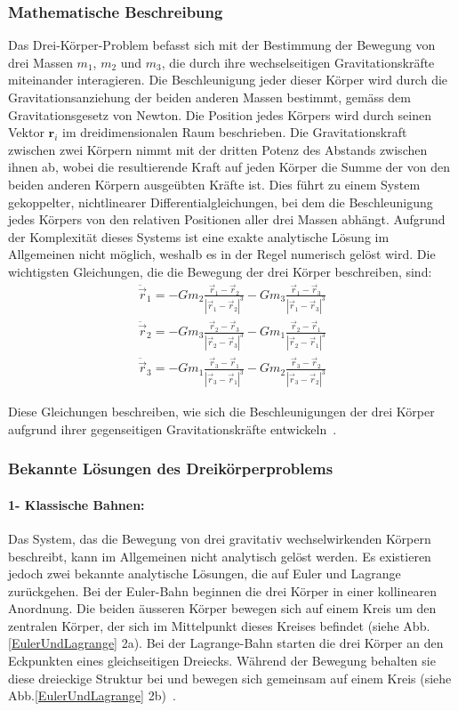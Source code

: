 \documentclass[a4paper,12pt,twoside]{article}
\begin{document}
\subsubsection{Mathematische Beschreibung}
Das Drei-Körper-Problem befasst sich mit der Bestimmung der Bewegung von drei Massen 
\( m_1 \), \( m_2 \) und \( m_3 \), die durch ihre wechselseitigen Gravitationskräfte 
miteinander interagieren. Die Beschleunigung jeder dieser Körper wird durch die 
Gravitationsanziehung der beiden anderen Massen bestimmt, gemäss dem Gravitationsgesetz 
von Newton. Die Position jedes Körpers wird durch seinen Vektor \( \mathbf{r}_i \) 
im dreidimensionalen Raum beschrieben. Die Gravitationskraft zwischen zwei Körpern 
nimmt mit der dritten Potenz des Abstands zwischen ihnen ab, wobei die resultierende 
Kraft auf jeden Körper die Summe der von den beiden anderen Körpern ausgeübten Kräfte ist. Dies führt zu einem System gekoppelter, nichtlinearer Differentialgleichungen, bei dem die Beschleunigung jedes Körpers von den relativen Positionen aller drei Massen abhängt. Aufgrund der Komplexität dieses Systems ist eine exakte analytische Lösung im Allgemeinen nicht möglich, weshalb es in der Regel numerisch gelöst wird.
Die wichtigsten Gleichungen, die die Bewegung der drei Körper beschreiben, sind:
\begin{align*}
	\ddot{\vec{r}}_1 = -G m_2 \frac{\vec{r}_1 - \vec{r}_2}{|\vec{r}_1 - \vec{r}_2|^3} - G m_3 \frac{\vec{r}_1 - \vec{r}_3}{|\vec{r}_1 - \vec{r}_3|^3} \\
	\ddot{\vec{r}}_2 = -G m_3 \frac{\vec{r}_2 - \vec{r}_3}{|\vec{r}_2 - \vec{r}_3|^3} - G m_1 \frac{\vec{r}_2 - \vec{r}_1}{|\vec{r}_2 - \vec{r}_1|^3} \\
	\ddot{\vec{r}}_3 = -G m_1 \frac{\vec{r}_3 - \vec{r}_1}{|\vec{r}_3 - \vec{r}_1|^3} - G m_2 \frac{\vec{r}_3 - \vec{r}_2}{|\vec{r}_3 - \vec{r}_2|^3}
\end{align*}


Diese Gleichungen beschreiben, wie sich die Beschleunigungen der drei Körper aufgrund 
ihrer gegenseitigen Gravitationskräfte entwickeln~\cite{threebodylibretexts}.

\subsubsection{Bekannte Lösungen des Dreikörperproblems}
\paragraph{1- Klassische Bahnen:}
Das System, das die Bewegung von drei gravitativ wechselwirkenden Körpern beschreibt, 
kann im Allgemeinen nicht analytisch gelöst werden. 
Es existieren jedoch zwei bekannte analytische Lösungen, 
die auf Euler und Lagrange zurückgehen.
Bei der Euler-Bahn beginnen die drei Körper in einer kollinearen Anordnung. 
Die beiden äusseren Körper bewegen sich auf einem Kreis um den zentralen Körper, 
der sich im Mittelpunkt dieses Kreises befindet (siehe Abb.\ref{EulerUndLagrange} 2a).
Bei der Lagrange-Bahn starten die drei Körper an den Eckpunkten eines gleichseitigen 
Dreiecks. Während der Bewegung behalten sie diese dreieckige Struktur bei und 
bewegen sich gemeinsam auf einem Kreis 
(siehe Abb.\ref{EulerUndLagrange} 2b)~\cite{Ramos2019}.
\end{document}
